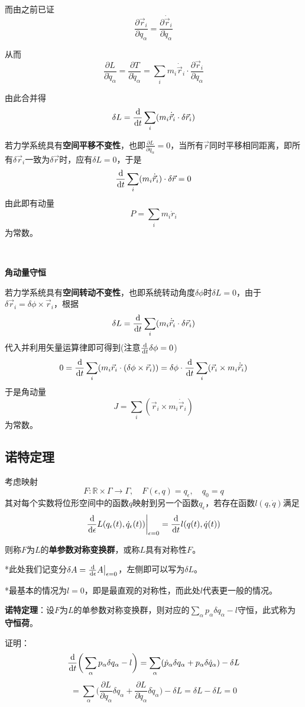 \documentclass[a4paper,UTF8,fontset=windows]{ctexart}
\newcommand*{\dr}{\hspace{0.07em}\mathrm{d}}
\begin{document}
而由之前已证
$$\frac{\partial\vec{r}_i}{\partial q_\alpha}=\frac{\partial\dot{\vec{r}}_i}{\partial\dot{q}_\alpha}$$

从而
$$\frac{\partial L}{\partial\dot{q}_\alpha}=\frac{\partial T}{\partial\dot{q}_\alpha}=\sum_im_i\dot{\vec{r}}_i\cdot\frac{\partial\vec{r}_i}{\partial q_\alpha}$$

由此合并得
$$\delta L=\frac{\dr}{\dr t}\sum_i(m_i\dot{\vec{r}}_i\cdot\delta\vec{r}_i)$$

若力学系统具有\textbf{空间平移不变性}，也即$\frac{\partial L}{\partial q_\alpha}=0$，当所有$\vec{r}$同时平移相同距离，即所有$\delta\vec{r}_i$一致为$\delta\vec{r}$时，应有$\delta L=0$，于是
$$\frac{\dr}{\dr t}\sum_i(m_i\dot{\vec{r}}_i)\cdot\delta\vec{r}=0$$
由此即有动量
$$P=\sum_im_i\dot{r}_i$$
为常数。

\

\textbf{角动量守恒}

若力学系统具有\textbf{空间转动不变性}，也即系统转动角度$\delta\phi$时$\delta L=0$，由于$\delta\vec{r}_i=\delta\phi\times\vec{r}_i$，根据
$$\delta L=\frac{\dr}{\dr t}\sum_i(m_i\dot{\vec{r}}_i\cdot\delta\vec{r}_i)$$
代入并利用矢量运算律即可得到(注意$\frac{\dr}{\dr t}\delta\phi=0$)
$$0=\frac{\dr}{\dr t}\sum_i(m_i\vec{r}_i\cdot(\delta\phi\times\vec{r}_i))=\delta\phi\cdot\frac{\dr}{\dr t}\sum_i(\vec{r}_i\times m_i\dot{\vec{r}}_i)$$
于是角动量
$$J=\sum_i(\vec{r}_i\times m_i\dot{\vec{r}}_i)$$
为常数。

\subsection{诺特定理}
考虑映射
$$F:\mathbb{R}\times\Gamma\to\Gamma,\quad F(\epsilon,q)=q_\epsilon,\quad q_0=q$$
其对每个实数将位形空间中的函数$q$映射到另一个函数$q_\epsilon$，若存在函数$l(q,\dot{q})$满足
$$\frac{\dr}{\dr\epsilon}L(q_\epsilon(t),\dot{q}_\epsilon(t))\bigg|_{\epsilon=0}=\frac{\dr}{\dr t}l(q(t),\dot{q}(t))$$

则称$F$为$L$的\textbf{单参数对称变换群}，或称$L$具有对称性$F$。

*此处我们记变分$\delta A=\frac{\dr}{\dr\epsilon}A\big|_{\epsilon=0}$，左侧即可以写为$\delta L$。

*最基本的情况为$l=0$，即是最直观的对称性，而此处$l$代表更一般的情况。

\textbf{诺特定理}：设$F$为$L$的单参数对称变换群，则对应的$\sum_\alpha p_\alpha\delta q_\alpha-l$守恒，此式称为\textbf{守恒荷}。

证明：
$$\frac{\dr}{\dr t}\bigg(\sum_\alpha p_\alpha\delta q_\alpha-l\bigg)=\sum_\alpha(\dot{p}_\alpha\delta q_\alpha+p_\alpha\delta\dot{q}_\alpha)-\delta L$$
$$=\sum_\alpha\bigg(\frac{\partial L}{\partial q_\alpha}\delta q_\alpha+\frac{\partial L}{\partial\dot{q}_\alpha}\delta\dot{q}_\alpha\bigg)-\delta L=\delta L-\delta L=0$$
\end{document}
